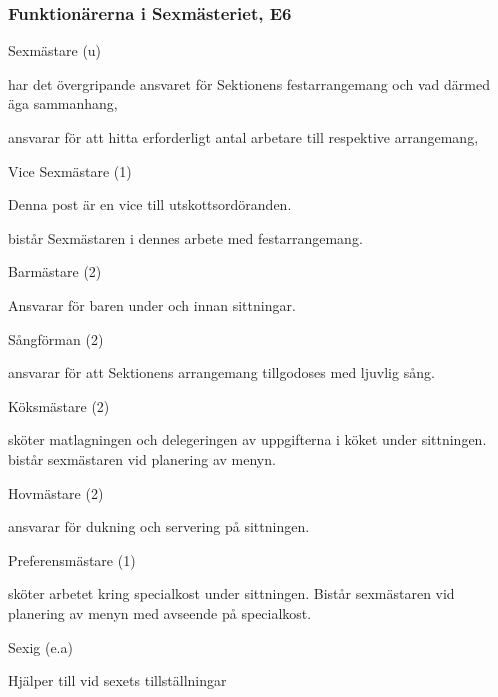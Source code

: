 \documentclass[10pt]{article}
\begin{document}
\subsubsection{Funktionärerna i Sexmästeriet, E6}

\begin{emptylist}
    \item Sexmästare (u)
        \begin{dashlist}
            \item har det övergripande ansvaret för Sektionens
                festarrangemang och vad därmed äga sammanhang,
            \item ansvarar för att hitta erforderligt antal arbetare
                till respektive arrangemang,
        \end{dashlist}
    \item Vice Sexmästare (1)
        \begin{dashlist}
            \item Denna post är en vice till utskottsordöranden.
            \item bistår Sexmästaren i dennes arbete med festarrangemang.
        \end{dashlist}
    \item Barmästare (2)
    \begin{tightdashlist}
        \item Ansvarar för baren under och innan sittningar.
    \end{tightdashlist}
    \item Sångförman (2)
        \begin{dashlist}
            \item ansvarar för att Sektionens arrangemang tillgodoses
                med ljuvlig sång.
        \end{dashlist}
    \item Köksmästare (2)
        \begin{dashlist}
        \item sköter matlagningen och delegeringen av uppgifterna i köket under sittningen. bistår sexmästaren vid planering
        av menyn.
        \end{dashlist}
    \item Hovmästare (2)
        \begin{dashlist}
        \item ansvarar för dukning och servering på sittningen.
        \end{dashlist}
    \item Preferensmästare (1)
        \begin{dashlist}
        \item sköter arbetet kring specialkost under sittningen. Bistår sexmästaren vid planering av menyn med avseende på
        specialkost.
        \end{dashlist}
    \item Sexig (e.a)
        \begin{dashlist}
        \item Hjälper till vid sexets tillställningar
        \end{dashlist}

\end{emptylist}
\end{document}
